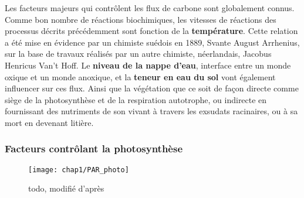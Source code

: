 Les facteurs majeurs qui contrôlent les flux de carbone sont globalement connus.
Comme bon nombre de réactions biochimiques, les vitesses de réactions des processus décrits précédemment sont fonction de la \textbf{température}.
Cette relation  a été mise en évidence par un chimiste suédois en 1889, Svante August Arrhenius, sur la base de travaux réalisés par un autre chimiste, néerlandais, Jacobus Henricus Van't Hoff.
Le \textbf{niveau de la nappe d'eau}, interface entre un monde oxique et un monde anoxique, et la \textbf{teneur en eau du sol} vont également influencer sur ces flux.
Ainsi que la végétation  que ce soit de façon directe comme siège de la photosynthèse et de la respiration autotrophe, ou indirecte en fournissant des nutriments de son vivant à travers les exsudats racinaires, ou à sa mort en devenant litière.


\subsubsection{Facteurs contrôlant la photosynthèse}

\begin{figure}
\centering
\texttt{[image: chap1/PAR\_photo]}
\caption{todo, modifié d'après \citet{long1993}}
\label{fig:PAR_photo}
\end{figure}

